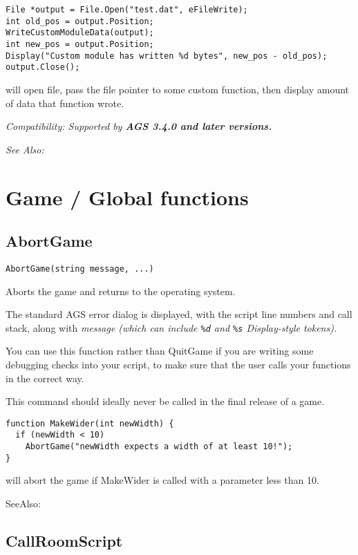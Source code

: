 \begin{verbatim}
File *output = File.Open("test.dat", eFileWrite);
int old_pos = output.Position;
WriteCustomModuleData(output);
int new_pos = output.Position;
Display("Custom module has written %d bytes", new_pos - old_pos);
output.Close();
\end{verbatim}
will open file, pass the file pointer to some custom function, then display amount of data that function wrote.

\it{Compatibility:} Supported by \bf{AGS 3.4.0} and later versions.

\it{See Also:} 



\section{Game / Global functions}\label{GlobalCommands}%



\subsection{AbortGame}\label{AbortGame}%

\begin{verbatim}
AbortGame(string message, ...)
\end{verbatim}
Aborts the game and returns to the operating system.

The standard AGS error dialog is displayed, with the script line numbers and call stack,
along with \it{message} (which can include \verb$%d$ and \verb$%s$ Display-style tokens).

You can use this function rather than QuitGame if you are writing some debugging checks
into your script, to make sure that the user calls your functions in the correct way.

This command should ideally never be called in the final release of a game.

\begin{verbatim}
function MakeWider(int newWidth) {
  if (newWidth < 10)
    AbortGame("newWidth expects a width of at least 10!");
}
\end{verbatim}
will abort the game if MakeWider is called with a parameter less than 10.

SeeAlso: 


\subsection{CallRoomScript}\label{CallRoomScript}%

